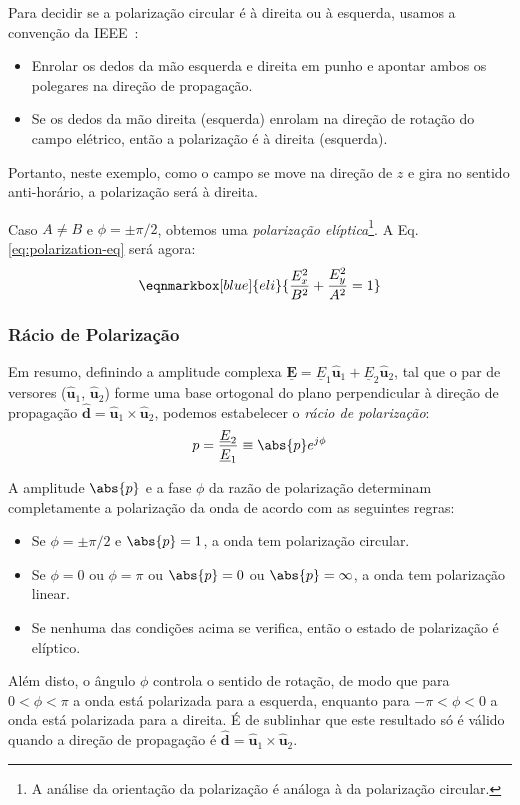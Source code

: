 \begin{warning}
    Para decidir se a polarização circular é à direita ou à esquerda, usamos a convenção da IEEE~\cite{ieee1983terms}: 
    \begin{itemize}
        \item Enrolar os dedos da mão esquerda e direita em punho e apontar ambos os polegares na direção de propagação. 
        \item Se os dedos da mão direita (esquerda) enrolam na direção de rotação do campo elétrico, então a polarização é à direita (esquerda).
    \end{itemize}
    Portanto, neste exemplo, como o campo se move na direção de $z$ e gira no sentido anti-horário, a polarização será à direita.
\end{warning}

Caso $A \neq B$ e $\phi = \pm \pi/2$, obtemos uma \textit{polarização elíptica}\footnote{A análise da orientação da polarização é análoga à da polarização circular.}. A Eq. \eqref{eq:polarization-eq} será agora:
\begin{equation}
    \eqnmarkbox[blue]{eli}{\frac{E_{x}^2}{B^2} + \frac{E_{y}^2}{A^2} = 1}
\end{equation}

\subsubsection{Rácio de Polarização}

Em resumo, definindo a amplitude complexa $\mathbf{\underline{E}} = \underline{E}_1 \mathbf{\hat{u}}_1 + \underline{E}_2 \mathbf{\hat{u}}_2$, tal que o par de versores ($\mathbf{\hat{u}}_1$, $\mathbf{\hat{u}}_2$) forme uma base ortogonal do plano perpendicular à direção de propagação $\mathbf{\hat{d}} = \mathbf{\hat{u}}_1 \times \mathbf{\hat{u}}_2$, podemos estabelecer o \textit{rácio de polarização}:
\begin{equation}
    p = \frac{\underline{E}_2}{\underline{E}_1} \equiv \abs{p} e^{j\phi}
\end{equation}

\begin{check}
    A amplitude $\abs{p}$ e a fase $\phi$ da razão de polarização determinam completamente a polarização da onda de acordo com as seguintes regras:
    \begin{itemize}
        \item Se $\phi = \pm \pi/2$ e $\abs{p} = 1$, a onda tem polarização circular.
        \item Se $\phi = 0$ ou $\phi = \pi$ ou $\abs{p} = 0$ ou $\abs{p} = \infty$, a onda tem polarização linear.
        \item Se nenhuma das condições acima se verifica, então o estado de polarização é elíptico.
    \end{itemize}
    Além disto, o ângulo $\phi$ controla o sentido de rotação, de modo que para $0 < \phi < \pi$ a onda está polarizada para a esquerda, enquanto para $-\pi < \phi < 0$ a onda está polarizada para a direita. É de sublinhar que este resultado só é válido quando a direção de propagação é $\mathbf{\hat{d}} = \mathbf{\hat{u}}_1 \times \mathbf{\hat{u}}_2$.
\end{check}

